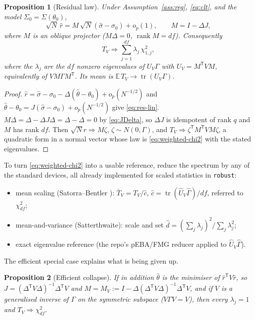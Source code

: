 \documentclass[11pt]{article}
\newcommand{\E}{\mathbb{E}}
\newcommand{\tr}{\operatorname{tr}}
\newcommand{\rank}{\operatorname{rank}}
\newcommand{\T}{^{\mathsf T}}
\newcommand{\Ninv}{^{-1}}
\theoremstyle{plain}
\newtheorem{proposition}{Proposition}
\theoremstyle{definition}
\theoremstyle{remark}
\begin{document}
\begin{proposition}[Residual law]\label{prop:gof}
Under Assumption~\ref{ass:reg}, \eqref{eq:clt}, and the model
$\Sigma_0=\Sigma(\theta_0)$,
\begin{equation}\label{eq:res-lin}
  \sqrt N\,\hat r=M\,\sqrt N(\hat\sigma-\sigma_0)+o_p(1),
  \qquad M=I-\Delta J,
\end{equation}
where $M$ is an oblique projector ($M\Delta=0$, $\rank M=df$). Consequently
\begin{equation}\label{eq:weighted-chi2}
  T_V\Rightarrow\sum_{j=1}^{df}\lambda_j\,\chi^2_{1,j},
\end{equation}
where the $\lambda_j$ are the $df$ nonzero eigenvalues of $U_V\Gamma$ with
$U_V=M\T V M$, equivalently of $VM\Gamma M\T$. Its mean is
$\E\,T_V\to\tr(U_V\Gamma)$.
\end{proposition}

\begin{proof}
$\hat r=\hat\sigma-\sigma_0-\Delta(\hat\theta-\theta_0)+o_p(N^{-1/2})$ and
$\hat\theta-\theta_0=J(\hat\sigma-\sigma_0)+o_p(N^{-1/2})$ give
\eqref{eq:res-lin}. $M\Delta=\Delta-\Delta J\Delta=\Delta-\Delta=0$ by
\eqref{eq:JDelta}, so $\Delta J$ is idempotent of rank $q$ and $M$ has rank
$df$. Then $\sqrt N\hat r\Rightarrow M\zeta$, $\zeta\sim N(0,\Gamma)$, and
$T_V\Rightarrow\zeta\T M\T V M\zeta$, a quadratic form in a normal vector whose
law is \eqref{eq:weighted-chi2} with the stated eigenvalues.
\end{proof}

To turn \eqref{eq:weighted-chi2} into a usable reference, reduce the spectrum by
any of the standard devices, all already implemented for scaled statistics in
\texttt{robust}:
\begin{itemize}
\item mean scaling (Satorra--Bentler \cite{satorrabentler1994}):
  $\bar T_V=T_V/\hat c$, $\hat c=\tr(\widehat U_V\widehat\Gamma)/df$, referred
  to $\chi^2_{df}$;
\item mean-and-variance (Satterthwaite): scale and set
  $\hat d=(\sum_j\lambda_j)^2/\sum_j\lambda_j^2$;
\item exact eigenvalue reference (the repo's pEBA/FMG reducer applied to
  $\widehat U_V\widehat\Gamma$).
\end{itemize}

The efficient special case explains what is being given up.

\begin{proposition}[Efficient collapse]\label{prop:collapse}
If in addition $\hat\theta$ is the minimiser of $\hat r\T V\hat r$, so
$J=(\Delta\T V\Delta)\Ninv\Delta\T V$ and $M=M_V:=I-\Delta(\Delta\T
V\Delta)\Ninv\Delta\T V$, and if $V$ is a generalised inverse of $\Gamma$ on the
symmetric subspace ($V\Gamma V=V$), then every $\lambda_j=1$ and
$T_V\Rightarrow\chi^2_{df}$.
\end{proposition}
\end{document}
